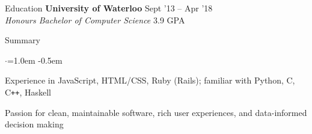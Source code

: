 \documentclass{resume} %
\begin{document}

\begin{rSection}{Education}
  {\bf University of Waterloo} \hfill {Sept '13 -- Apr '18} \\
  {\em Honours Bachelor of Computer Science} \hfill {3.9 GPA}
  \vspace{0.5em}
\end{rSection}



\begin{rSection}{Summary}
  \vspace {0.5em}
  \begin{list}{$\cdot$}{\leftmargin=1.0em}
    \itemsep -0.5em \vspace{-0.5em}
    \item Experience in JavaScript, HTML/CSS, Ruby (Rails); familiar with Python, C, C\texttt{++}, Haskell
    \item Passion for clean, maintainable software, rich user experiences, and data-informed decision making
  \end{list}
  \vspace{0.5em}
\end{rSection}

\end{document}
